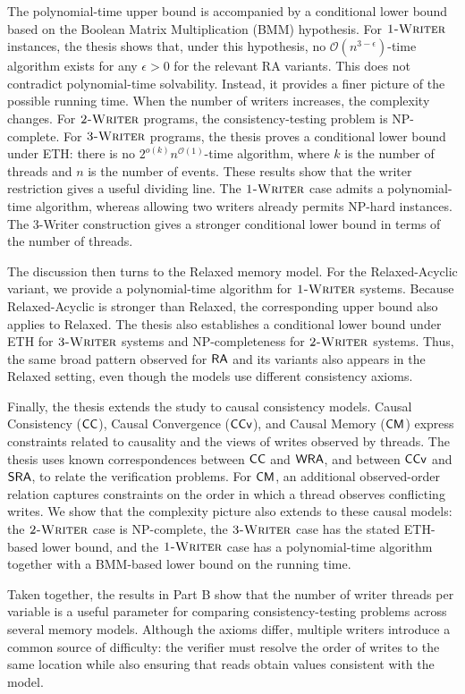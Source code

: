 The polynomial-time upper bound is accompanied by a conditional lower bound based on the Boolean Matrix Multiplication (BMM) hypothesis. For $\textsc{1-Writer}$ instances, the thesis shows that, under this hypothesis, no $\mathcal{O}(n^{3-\epsilon})$-time algorithm exists for any $\epsilon > 0$ for the relevant RA variants. This does not contradict polynomial-time solvability. Instead, it provides a finer picture of the possible running time. When the number of writers increases, the complexity changes. For $\textsc{2-Writer}$ programs, the consistency-testing problem is NP-complete. For $\textsc{3-Writer}$  programs, the thesis proves a conditional lower bound under ETH: there is no $2^{o(k)}n^{\mathcal{O}(1)}$-time algorithm, where $k$ is the number of threads and $n$ is the number of events. These results show that the writer restriction gives a useful dividing line. The $\textsc{1-Writer}$ case admits a polynomial-time algorithm, whereas allowing two writers already permits NP-hard instances. The 3-Writer construction gives a stronger conditional lower bound in terms of the number of threads.

The discussion then turns to the Relaxed memory model. For the Relaxed-Acyclic variant, we provide a polynomial-time algorithm for $\textsc{1-Writer}$ systems. Because Relaxed-Acyclic is stronger than Relaxed, the corresponding upper bound also applies to Relaxed. The thesis also establishes a conditional lower bound under ETH for $\textsc{3-Writer}$ systems and NP-completeness for $\textsc{2-Writer}$  systems. Thus, the same broad pattern observed for $\mathsf{RA}$ and its variants also appears in the Relaxed setting,  even though the models use different consistency axioms.

Finally, the thesis extends the study to causal consistency models. Causal Consistency ($\mathsf{CC}$), Causal Convergence ($\mathsf{CCv}$), and Causal Memory ($\mathsf{CM}$) express constraints related to causality and the views of writes observed by threads. The thesis uses known correspondences between $\mathsf{CC}$ and $\mathsf{WRA}$, and between $\mathsf{CCv}$ and $\mathsf{SRA}$, to relate the verification problems. For $\mathsf{CM}$, an additional observed-order relation captures constraints on the order in which a thread observes conflicting writes. We show that the complexity picture also extends to these causal models: the $\textsc{2-Writer}$ case is NP-complete, the $\textsc{3-Writer}$ case has the stated ETH-based lower bound, and the $\textsc{1-Writer}$ case has a polynomial-time algorithm together with a BMM-based lower bound on the running time.

Taken together, the results in Part B show that the number of writer threads per variable is a useful parameter for comparing consistency-testing problems across several memory models. Although the axioms differ, multiple writers introduce a common source of difficulty: the verifier must resolve the order of writes to the same location while also ensuring that reads obtain values consistent with the model.


